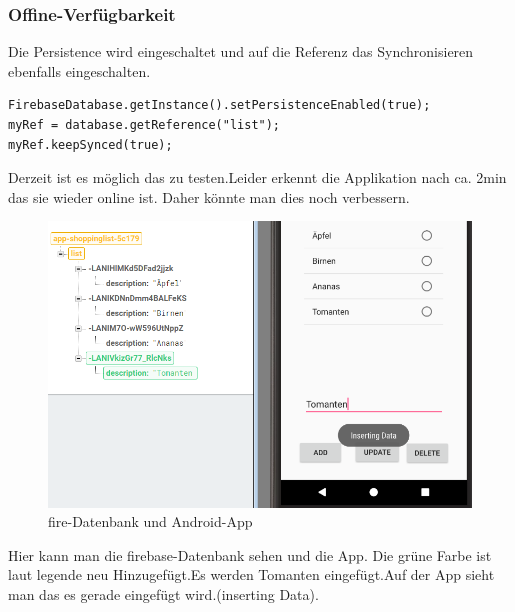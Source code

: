 \subsubsection{Offine-Verfügbarkeit}
Die Persistence wird eingeschaltet und auf die Referenz das Synchronisieren ebenfalls eingeschalten.\cite{offline}
\begin{lstlisting}[style=Java,caption={Offine-Verfügbarkeit}]
FirebaseDatabase.getInstance().setPersistenceEnabled(true);
myRef = database.getReference("list");
myRef.keepSynced(true);
\end{lstlisting}
Derzeit ist es möglich das zu testen.Leider erkennt die Applikation nach ca. 2min das sie wieder online ist. Daher könnte man dies noch verbessern.
\begin{figure}
	\centering
	\includegraphics[width=0.7\linewidth]{images/livedemo}
	\caption{fire-Datenbank und Android-App}
	\label{fig:livedemo}
\end{figure}

Hier kann man die firebase-Datenbank sehen und die App. Die grüne Farbe ist laut legende neu Hinzugefügt.Es werden Tomanten eingefügt.Auf der App sieht man das es gerade eingefügt wird.(inserting Data).
